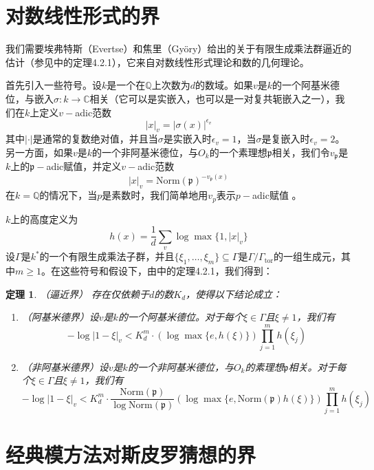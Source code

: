 \documentclass{article}
\newtheorem{theorem}{定理}
\begin{document}
\section{对数线性形式的界}


我们需要埃弗特斯（Evertse）和焦里（Györy）给出的关于有限生成乘法群逼近的估计（参见\cite{3}中的定理4.2.1），它来自对数线性形式理论和数的几何理论。


首先引入一些符号。设\(k\)是一个在\(\mathbb{Q}\)上次数为\(d\)的数域。如果\(v\)是\(k\)的一个阿基米德位，与嵌入\(\sigma: k \to \mathbb{C}\)相关（它可以是实嵌入，也可以是一对复共轭嵌入之一），我们在\(k\)上定义\(v -\)adic范数
\[|x|_{v}=|\sigma(x)|^{\epsilon_{v}}\]
其中\(|\cdot|\)是通常的复数绝对值，并且当\(\sigma\)是实嵌入时\(\epsilon_{v}=1\)，当\(\sigma\)是复嵌入时\(\epsilon_{v}=2\)。另一方面，如果\(v\)是\(k\)的一个非阿基米德位，与\(O_{k}\)的一个素理想\(\mathfrak{p}\)相关，我们令\(v_{\mathfrak{p}}\)是\(k\)上的\(\mathfrak{p}-\)adic赋值，并定义\(v -\)adic范数
\[|x|_{v}=\text{Norm}(\mathfrak{p})^{-v_{\mathfrak{p}}(x)}\]
在\(k = \mathbb{Q}\)的情况下，当\(p\)是素数时，我们简单地用\(v_{p}\)表示\(p -\)adic赋值 。


\(k\)上的高度定义为
\[h(x)=\frac{1}{d} \sum_{v} \log \max \{1,|x|_{v}\}\]
设\(\Gamma\)是\(k^{*}\)的一个有限生成乘法子群，并且\(\{\xi_{1}, \ldots, \xi_{m}\} \subseteq \Gamma\)是\(\Gamma / \Gamma_{\text{tor}}\)的一组生成元，其中\(m \geq 1\)。在这些符号和假设下，由\cite{3}中的定理4.2.1，我们得到：
\setcounter{theorem}{0}
\renewcommand{\thetheorem}{2.\arabic{theorem}}
\begin{theorem}（逼近界）
存在仅依赖于\(d\)的数\(K_{d}\)，使得以下结论成立：
\begin{enumerate}
\item
（阿基米德界）设\(v\)是\(k\)的一个阿基米德位。对于每个\(\xi \in \Gamma\)且\(\xi \neq 1\)，我们有
\[- \log |1-\xi|_{v}<K_{d}^{m} \cdot (\log \max \{e, h(\xi)\}) \prod_{j = 1}^{m} h(\xi_{j})\]
\item
（非阿基米德界）设\(v\)是\(k\)的一个非阿基米德位，与\(O_{k}\)的素理想\(\mathfrak{p}\)相关。对于每个\(\xi \in \Gamma\)且\(\xi \neq 1\)，我们有
\[- \log |1-\xi|_{v}<K_{d}^{m} \cdot \frac{\text{Norm}(\mathfrak{p})}{\log \text{Norm}(\mathfrak{p})}(\log \max \{e, \text{Norm}(\mathfrak{p}) h(\xi)\}) \prod_{j = 1}^{m} h(\xi_{j})\]
\end{enumerate}
\end{theorem}

\section{经典模方法对斯皮罗猜想的界}
\end{document}
